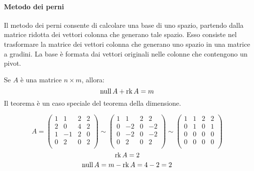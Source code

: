 \paragraph*{Metodo dei perni}
Il metodo dei perni consente di calcolare una base di uno spazio, partendo dalla matrice ridotta dei vettori colonna che generano tale spazio. Esso consiste nel trasformare la matrice dei vettori colonna che generano uno spazio in una matrice a gradini. La base è formata dai vettori originali nelle colonne che contengono un pivot.

\begin{theorem}
  Se $A$ è una matrice $n\times m$, allora:
  $$\operatorname{null} A+\operatorname{rk} A=m$$
  Il teorema è un caso speciale del teorema della dimensione.
\end{theorem}

\begin{example}
  $$
    A=
    \begin{pmatrix}
      1 & 1  & 2 & 2 \\
      2 & 0  & 4 & 2 \\
      1 & -1 & 2 & 0 \\
      0 & 2  & 0 & 2 \\
    \end{pmatrix}
    \sim
    \begin{pmatrix}
      1 & 1  & 2 & 2  \\
      0 & -2 & 0 & -2 \\
      0 & -2 & 0 & -2 \\
      0 & 2  & 0 & 2  \\
    \end{pmatrix}
    \sim
    \begin{pmatrix}
      1 & 1 & 2 & 2 \\
      0 & 1 & 0 & 1 \\
      0 & 0 & 0 & 0 \\
      0 & 0 & 0 & 0 \\
    \end{pmatrix}
  $$
  $$\operatorname{rk} A = 2$$
  $$\operatorname{null} A=m-\operatorname{rk} A=4-2=2$$
\end{example}
